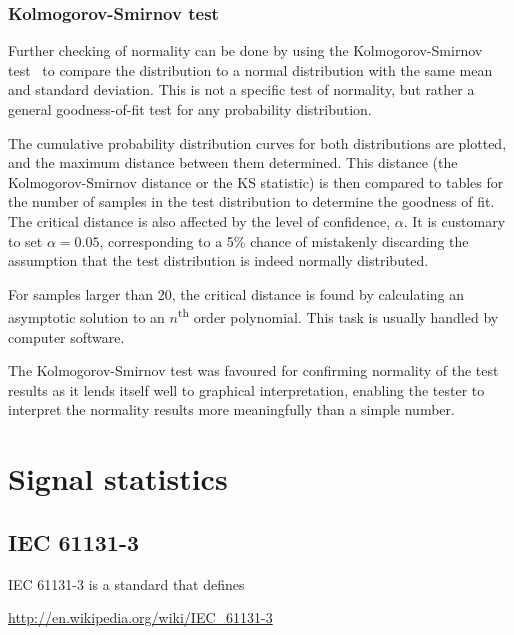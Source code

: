 \subsubsection{Kolmogorov-Smirnov test}\label{sec:kolm-smirn-test}
Further checking of normality can be done by using the
Kolmogorov-Smirnov test~\citep[392--394]{chakravartistat} to compare
the distribution to a normal distribution with the same mean and
standard deviation.  This is not a specific test of normality, but
rather a general goodness-of-fit test for any probability
distribution.

The cumulative probability distribution curves for both distributions
are plotted, and the maximum distance between them determined.  This
distance (the Kolmogorov-Smirnov distance or the KS statistic) is then
compared to tables for the number of samples in the test distribution
to determine the goodness of fit.  The critical distance is also
affected by the level of confidence, $\alpha$.  It is customary to set
$\alpha=\num{0.05}$, corresponding to a 5\% chance of mistakenly
discarding the assumption that the test distribution is indeed
normally distributed.

For samples larger than 20, the critical distance is found by
calculating an asymptotic solution to an $n$\textsuperscript{th} order
polynomial.  This task is usually handled by computer software.

The Kolmogorov-Smirnov test was favoured for confirming normality of
the test results as it lends itself well to graphical interpretation,
enabling the tester to interpret the normality results more
meaningfully than a simple number.

\section{Signal statistics}


\subsection{IEC 61131-3}
IEC 61131-3 is a standard that defines

\url{http://en.wikipedia.org/wiki/IEC_61131-3}

